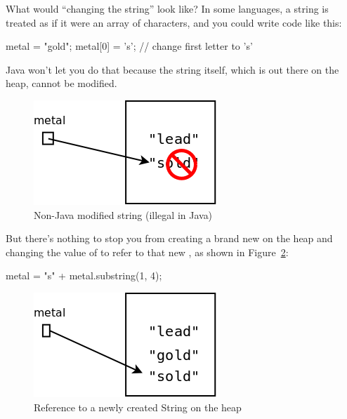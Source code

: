 What would ``changing the string'' look like? In some languages, a string is treated as if it were an array of characters, and you could write code like this:

\begin{code}
metal = "gold";
metal[0] = 's'; // change first letter to 's'
\end{code}

Java won't let you do that because the string itself, which is out there on the heap, cannot be modified.

\begin{figure}[!h]
\begin{center}
\includegraphics[scale=0.4]{figs/ch09/bad_heap.png}
\caption{Non-Java modified string (illegal in Java)}
\label{fig.bad.heap}
\end{center}
\end{figure}

But there's nothing to stop you from creating a brand new  on the heap and changing the value of  to refer to that new , as shown in Figure~\ref{fig.heap3}:

\begin{code}
metal = "s" + metal.substring(1, 4);
\end{code}

\begin{figure}[!h]
\begin{center}
\includegraphics[scale=0.4]{figs/ch09/heap3.png}
\caption{Reference to a newly created String on the heap}
\label{fig.heap3}
\end{center}
\end{figure}

\clearpage

